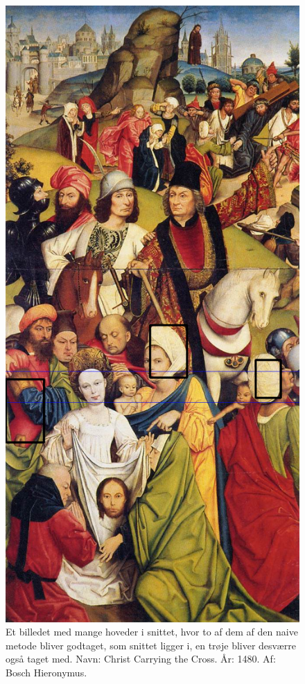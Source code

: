 \begin{figure}[h!!]
	\begin{center}
		\includegraphics[scale=0.3,angle=0]{afsnit/afprovning/billeder/naive_losning/naiv_kfarver_kdetaljer.png}
	\end{center}
	\caption[]{Et billedet med mange hoveder i snittet, hvor to af dem
	af den naive metode bliver godtaget, som snittet ligger i, en
	trøje bliver desværre også taget med. Navn: Christ Carrying the
	Cross. År: 1480. Af: Bosch Hieronymus.}
	\label{naiv_kfarver_kdetaljer}
\end{figure}

